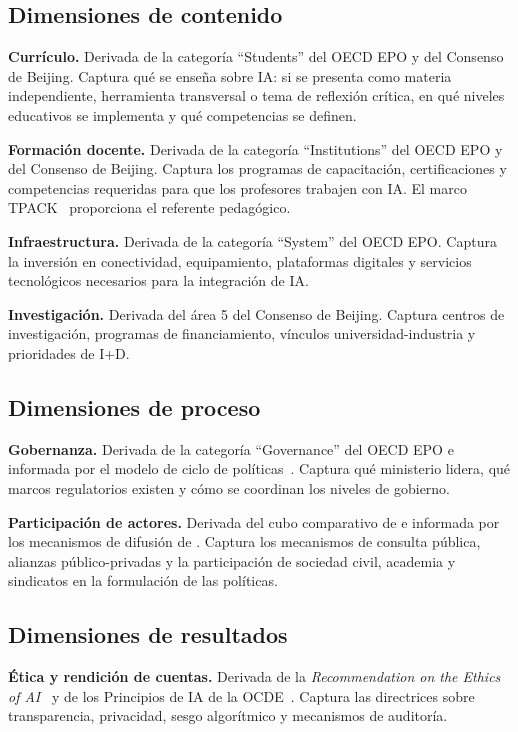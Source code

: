 \subsection{Dimensiones de contenido}

\textbf{Currículo.} Derivada de la categoría ``Students'' del OECD EPO y del Consenso de Beijing. Captura qué se enseña sobre IA: si se presenta como materia independiente, herramienta transversal o tema de reflexión crítica, en qué niveles educativos se implementa y qué competencias se definen.

\textbf{Formación docente.} Derivada de la categoría ``Institutions'' del OECD EPO y del Consenso de Beijing. Captura los programas de capacitación, certificaciones y competencias requeridas para que los profesores trabajen con IA. El marco TPACK~\citep{mishra2006technological} proporciona el referente pedagógico.

\textbf{Infraestructura.} Derivada de la categoría ``System'' del OECD EPO. Captura la inversión en conectividad, equipamiento, plataformas digitales y servicios tecnológicos necesarios para la integración de IA.

\textbf{Investigación.} Derivada del área 5 del Consenso de Beijing. Captura centros de investigación, programas de financiamiento, vínculos universidad-industria y prioridades de I+D.


\subsection{Dimensiones de proceso}

\textbf{Gobernanza.} Derivada de la categoría ``Governance'' del OECD EPO e informada por el modelo de ciclo de políticas~\citep{howlett2003studying}. Captura qué ministerio lidera, qué marcos regulatorios existen y cómo se coordinan los niveles de gobierno.

\textbf{Participación de actores.} Derivada del cubo comparativo de \citet{bray1995levels} e informada por los mecanismos de difusión de \citet{shipan2012diffusion}. Captura los mecanismos de consulta pública, alianzas público-privadas y la participación de sociedad civil, academia y sindicatos en la formulación de las políticas.


\subsection{Dimensiones de resultados}

\textbf{Ética y rendición de cuentas.} Derivada de la \textit{Recommendation on the Ethics of AI}~\citep{unesco2021ai} y de los Principios de IA de la OCDE~\citep{oecd2019ai}. Captura las directrices sobre transparencia, privacidad, sesgo algorítmico y mecanismos de auditoría.

